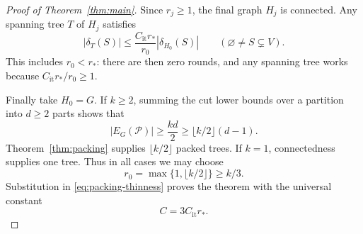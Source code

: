 \begin{proof}[Proof of Theorem~\ref{thm:main}]
Since \(r_j\ge1\), the final graph \(H_j\) is connected.
Any spanning tree \(T\) of \(H_j\) satisfies
\begin{equation}\label{eq:packing-thinness}
 |\delta_T(S)|\le\frac{C_{\mathrm{it}}r_*}{r_0}|\delta_{H_0}(S)|
 \qquad(\varnothing\ne S\subsetneq V).
\end{equation}
This includes \(r_0<r_*\): there are then zero rounds, and any
spanning tree works because \(C_{\mathrm{it}}r_*/r_0\ge1\).

Finally take \(H_0=G\). If \(k\ge2\), summing the cut lower bounds
over a partition into \(d\ge2\) parts shows that
\[
 |E_G(\mathcal P)|\ge\frac{kd}{2}
 \ge\lfloor k/2\rfloor(d-1).
\]
Theorem~\ref{thm:packing} supplies \(\lfloor k/2\rfloor\) packed
trees. If \(k=1\), connectedness supplies one tree.
Thus in all cases we may choose
\[
 r_0=\max\{1,\lfloor k/2\rfloor\}\ge k/3.
\]
Substitution in \eqref{eq:packing-thinness} proves the theorem with
the universal constant
\[
 C=3C_{\mathrm{it}}r_*.
\]
\end{proof}
